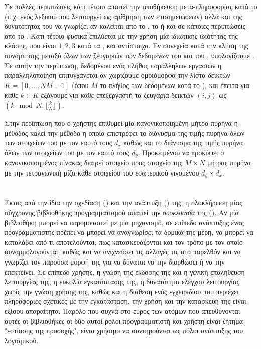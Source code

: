 Σε πολλές περιπτώσεις κάτι τέτοιο απαιτεί την αποθήκευση μετα-πληροφορίας κατά το \texttt{} (π.χ. ενός λεξικού που λειτουργεί ως αρίθμηση των επισημειώσεων) αλλά και της δυνατότητας του \texttt{} να γνωρίζει αν καλείται από το \texttt{}, το \texttt{} ή και σε κάποιες περιπτώσεις από το \texttt{}.
Κάτι τέτοιο φυσικά επιλύεται με την χρήση μία ιδιωτικής \texttt{} ιδιότητας της κλάσης, που είναι $1, 2, 3$ κατά τα \texttt{}, \texttt{} και \texttt{} αντίστοιχα.
Εν συνεχεία κατά την κλήση της συνάρτησης \texttt{} μεταξύ όλων των ζευγαριών των δεδομένων του \texttt{} και του \texttt{}, υπολογίζουμε \texttt{}.
Σε αυτήν την περίπτωση, δεδομένου ενός πλήθος παράλληλων εργασιών \texttt{} η παραλληλοποίηση επιτυγχάνεται αν χωρίζουμε ομοιόμορφα την λίστα δεικτών $K = [0, \dots, Ν Μ - 1]$ (όπου $Μ$ το πλήθος των δεδομένων κατά το \texttt{}), και έπειτα για κάθε $k \in K$ εξάγουμε για κάθε επεξεργαστή τα ζευγάρια δεικτών $(i,j)$ ως $(k\mod N, \lfloor \frac{k}{N} \rfloor)$.

Στην περίπτωση που ο χρήστης επιθυμεί μία κανονικοποιημένη μήτρα πυρήνα η μέθοδος \texttt{} καλεί την μέθοδο \texttt{} η οποία επιστρέφει το διάνυσμα της τιμής πυρήνα όλων των στοιχείων του \texttt{} με τον εαυτό τους $d_{x}$ καθώς και το διάνυσμα της τιμής πυρήνα όλων των στοιχείων του \texttt{} με τον εαυτό τους $d_{y}$.
Προκειμένου να προκύψει ο κανονικοποημένος πίνακας διαιρεί στοιχείο προς στοιχείο της $Μ \times N$ μήτρας πυρήνα με την τετραγωνική ρίζα κάθε στοιχείου του εσωτερικού γινομένου $d_{y} \times d_{x}$.


\section{}
Έκτος από την ίδια την σχεδίαση () και την ανάπτυξη () της, η ολοκλήρωση μίας σύγχρονης βιβλιοθήκης προγραμματισμού απαιτεί την \textit{συσκευασία} της ().
Αν μία βιβλιοθήκη μπορεί να παρομοιαστεί με μία μηχανισμό, σε επίπεδο ανάπτυξης ένας προγραμματιστής πρέπει να μπορεί να αναγνωρίσει τα δομικά της μέρη, να μπορεί να καταλάβει από τι αποτελούνται, πως κατασκευάζονται και τον τρόπο με τον οποίο συναρμολογούνται, καθώς και να ανιχνεύσει τις αλλαγές τις στο παρελθόν και να γνωρίζει τον παρούσα μορφή της για να δύναται να την διορθώσει ή να την επεκτείνει.
Σε επίπεδο χρήσης, η γνώση της έκδοσης της και η γενική επαλήθευση λειτουργίας της, η ευκολία εγκατάστασης της, η δυνατότητα ελέγχου λειτουργίας χωρίς την γνώση χρήσης της, καθώς και η διάθεση ενός εγχειριδίου που περιέχει πληροφορίες σχετικές με την εγκατάσταση, την χρήση και την κατασκευή της είναι εξίσου απαραίτητα.
Παρόλο που συχνά στο εύρος των ατόμων που απευθύνονται αυτές οι βιβλιοθήκες οι δύο αυτοί ρόλοι προγραμματιστή και χρήστη είναι ζήτημα "εστίασης της προσοχής", είναι χρήσιμο να συντηρούνται ως πόλοι ανάπτυξης του λογισμικού.
